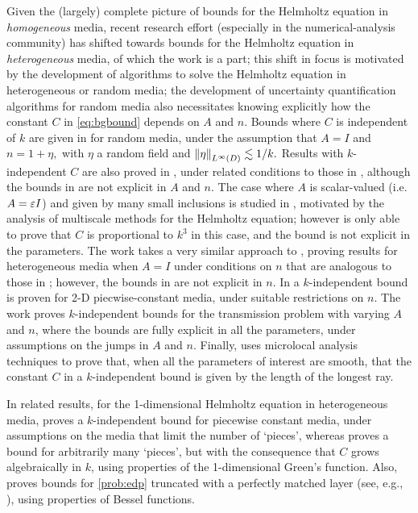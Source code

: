 Given the (largely) complete picture of bounds for the Helmholtz equation in \emph{homogeneous} media, recent research effort (especially in the numerical-analysis community) has shifted towards bounds for the Helmholtz equation in \emph{heterogeneous} media, of which the work \cite{GrPeSp:19} is a part; this shift in focus is motivated by the development of algorithms to solve the Helmholtz equation in heterogeneous or random media; the development of uncertainty quantification algorithms for random media also necessitates knowing explicitly how the constant $C$ in \eqref{eq:bgbound} depends on $A$ and $n$. Bounds where $C$ is independent of $k$ are given in \cite{FeLiLo:15} for random media, under the assumption that $A=I$ and $n = 1 + \eta,$ with $\eta$ a random field and $\NLiD{\eta} \lesssim 1/k.$ Results with $k$-independent $C$ are also proved in \cite{BrGaPe:17}, under related conditions to those in \cite{GrPeSp:19}, although the bounds in \cite{GrGaPe:17} are not explicit in $A$ and $n$. The case where $A$ is scalar-valued (i.e. $A = \varepsilon I$) and given by many small inclusions is studied in \cite{OhVe:18}, motivated by the analysis of multiscale methods for the Helmholtz equation; however \cite{OhVe:18} is only able to prove that $C$ is proportional to $k^3$ in this case, and the bound is not explicit in the parameters. The work \cite{GrSa:18} takes a very similar approach to \cite{GrPeSp:19}, proving results for heterogeneous media when $A=I$ under conditions on $n$ that are analogous to those in \cite{GrPeSp:19}; however, the bounds in \cite{GrSa:18} are not explicit in $n.$ In \cite{BaChGo:17} a $k$-independent bound is proven for 2-D piecwise-constant media, under suitable restrictions on $n.$ The work \cite{MoSp:19} proves $k$-independent bounds for the transmission problem with varying $A$ and $n$, where the bounds are fully explicit in all the parameters, under assumptions on the jumps in $A$ and $n.$ Finally, \cite{GaSpWu:18} uses microlocal analysis techniques to prove that, when all the parameters of interest are smooth, that the constant $C$ in a $k$-independent bound is given by the length of the longest ray.

In related results, for the 1-dimensional Helmholtz equation in heterogeneous media, \cite{Ch:15} proves a $k$-independent bound for piecewise constant media, under assumptions on the media that limit the number of `pieces', whereas \cite{SaTo:18} proves a bound for arbitrarily many `pieces', but with the consequence that $C$ grows algebraically in $k$, using properties of the 1-dimensional Green's function. Also, \cite{LiWu:18} proves bounds for \cref{prob:edp} truncated with a perfectly matched layer (see, e.g., ), using properties of Bessel functions.

